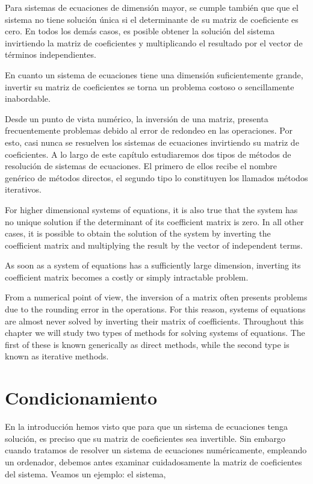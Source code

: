 \begin{paracol}{2}
Para sistemas de ecuaciones de dimensión mayor, se cumple también que que el sistema no tiene solución única si el determinante de su matriz de coeficiente es cero. En todos los demás casos, es posible obtener la solución del sistema invirtiendo la matriz de coeficientes y multiplicando el resultado por el vector de términos independientes.

En cuanto un sistema de ecuaciones tiene una dimensión suficientemente grande, invertir su matriz de coeficientes se torna un problema costoso o sencillamente inabordable.

Desde un punto de vista numérico, la inversión de una matriz, presenta frecuentemente problemas debido al error de redondeo en las operaciones. Por esto, casi nunca se resuelven los sistemas de ecuaciones invirtiendo su matriz de coeficientes. A lo largo de este capítulo estudiaremos dos tipos de métodos de resolución de sistemas de ecuaciones. El primero de ellos recibe el nombre genérico de métodos directos, el segundo tipo lo constituyen los llamados métodos iterativos.

\switchcolumn
For higher dimensional systems of equations, it is also true that the system has no unique solution if the determinant of its coefficient matrix is zero. In all other cases, it is possible to obtain the solution of the system by inverting the coefficient matrix and multiplying the result by the vector of independent terms.

As soon as a system of equations has a sufficiently large dimension, inverting its coefficient matrix becomes a costly or simply intractable problem.

From a numerical point of view, the inversion of a matrix often presents problems due to the rounding error in the operations. For this reason, systems of equations are almost never solved by inverting their matrix of coefficients. Throughout this chapter we will study two types of methods for solving systems of equations. The first of these is known generically as direct methods, while the second type is known as iterative methods.

\switchcolumn
\section{Condicionamiento}
En la introducción hemos visto que para que un sistema de ecuaciones tenga solución, es preciso que su matriz de coeficientes sea invertible. Sin embargo cuando tratamos de resolver un sistema de ecuaciones numéricamente, empleando un ordenador, debemos antes examinar cuidadosamente la matriz de coeficientes del sistema. Veamos un ejemplo: el sistema,


\end{paracol}
